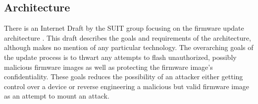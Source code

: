 \documentclass[0-thesis.tex]{subfiles}
\begin{document}
\subsection{Architecture}
\label{ssec:architecture}
There is an Internet Draft by the SUIT group focusing on the firmware update architecture
\parencite{suit-architecture}. This draft describes the goals and requirements of the
architecture, although makes no mention of any particular technology. The overarching
goals of the update process is to thwart any attempts to flash unauthorized, possibly
malicious firmware images as well as protecting the firmware image's confidentiality.
These goals reduces the possibility of an attacker either getting control over a device or
reverse engineering a malicious but valid firmware image as an attempt to mount an attack.
\end{document}
